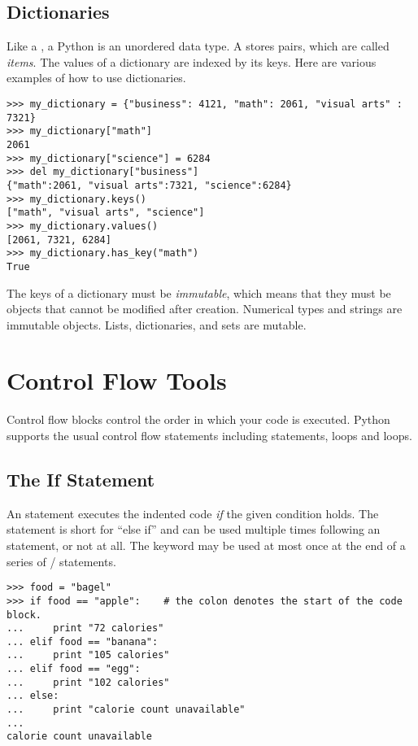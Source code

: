 

\subsection*{Dictionaries}
Like a , a Python  is an unordered data type.  A  stores  pairs, which are called \emph{items}. The values of a dictionary are indexed by its keys.  Here are various examples of how to use dictionaries.
\begin{lstlisting}
>>> my_dictionary = {"business": 4121, "math": 2061, "visual arts" : 7321} 
>>> my_dictionary["math"]
2061
>>> my_dictionary["science"] = 6284
>>> del my_dictionary["business"]
{"math":2061, "visual arts":7321, "science":6284}
>>> my_dictionary.keys()
["math", "visual arts", "science"]
>>> my_dictionary.values()
[2061, 7321, 6284]
>>> my_dictionary.has_key("math")
True
\end{lstlisting}

The keys of a dictionary must be \emph{immutable}, which means that they must be objects that cannot be modified after creation. Numerical types and strings are immutable objects. Lists, dictionaries, and sets are mutable.


\section*{Control Flow Tools}
Control flow blocks control the order in which your code is executed.
Python supports the usual control flow statements 
including  statements,  loops and  loops. 

\subsection*{The If Statement}
An  statement executes the 
indented code \emph{if} the given condition holds.
The  statement is short for ``else if'' and can be used multiple times following an  statement, or not at all. 
The  keyword may be used at most once at the end of a series of / statements.
\begin{lstlisting}
>>> food = "bagel"         
>>> if food == "apple":    # the colon denotes the start of the code block.
...     print "72 calories"
... elif food == "banana":
...     print "105 calories"
... elif food == "egg":
...     print "102 calories"
... else: 
...     print "calorie count unavailable"
...     
calorie count unavailable
\end{lstlisting}

